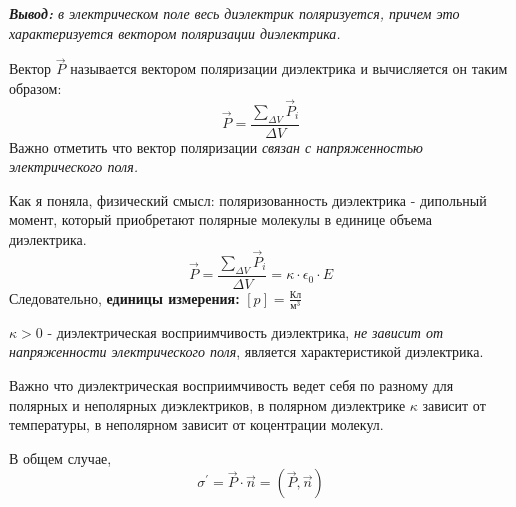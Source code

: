 \documentclass[../main.tex]{subfiles}
\begin{document}
\vspace{5px}

\textit{\textbf{Вывод:} в электрическом поле весь диэлектрик поляризуется, причем это характеризуется вектором поляризации диэлектрика.}

\vspace{5px}

 Вектор $\vec P$ называется вектором поляризации диэлектрика и вычисляется он таким образом:
\[ \vec P = \frac{\sum_{\Delta V} \vec P_i}{\Delta V}\]
Важно отметить что вектор поляризации \textit{связан с напряженностью электрического поля.}

Как я поняла, физический смысл: поляризованность диэлектрика - дипольный момент, который приобретают полярные молекулы в единице объема диэлектрика.
\[ \vec P  = \frac{\sum_{\Delta V} \vec P_i}{\Delta V} = \kappa \cdot \epsilon_0 \cdot E\]
Следовательно, \textbf{единицы измерения:} $[p] = \frac{\text{Кл}}{\text{м}^3}$

\vspace{5px}

$\kappa > 0$ - диэлектрическая восприимчивость диэлектрика, \textit{не зависит от напряженности электрического поля}, является характеристикой диэлектрика.

\vspace{5px}

Важно что диэлектрическая восприимчивость ведет себя по разному для полярных и неполярных диэклектриков, в полярном диэлектрике $\kappa$ зависит от температуры, в неполярном зависит от коцентрации молекул.

В общем случае, \[ \sigma^\prime = \vec P \cdot \vec n = (\vec P, \vec n) \]
\end{document}
